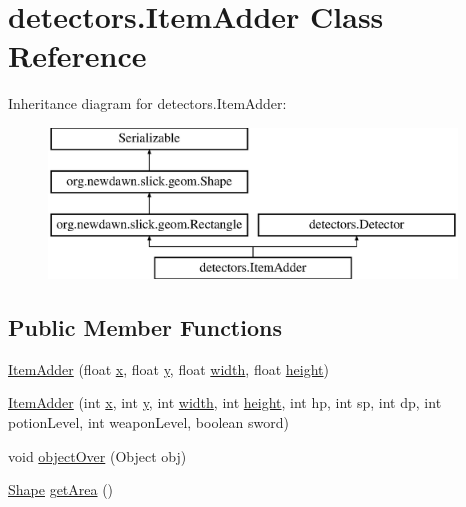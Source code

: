 \hypertarget{classdetectors_1_1_item_adder}{}\section{detectors.\+Item\+Adder Class Reference}
\label{classdetectors_1_1_item_adder}
Inheritance diagram for detectors.\+Item\+Adder\+:\begin{figure}[H]
\begin{center}
\leavevmode
\includegraphics[height=4.000000cm]{classdetectors_1_1_item_adder}
\end{center}
\end{figure}
\subsection*{Public Member Functions}
\begin{DoxyCompactItemize}
\item 
\mbox{\hyperlink{classdetectors_1_1_item_adder_af4b3e0a665b216da9f79393848081355}{Item\+Adder}} (float \mbox{\hyperlink{classorg_1_1newdawn_1_1slick_1_1geom_1_1_shape_a3e985bfff386c15a4efaad03d8ad60d3}{x}}, float \mbox{\hyperlink{classorg_1_1newdawn_1_1slick_1_1geom_1_1_shape_a9f934baded6a1b65ebb69e7e5f80ea00}{y}}, float \mbox{\hyperlink{classorg_1_1newdawn_1_1slick_1_1geom_1_1_rectangle_a967e1823f62daf45abb142779d1be62d}{width}}, float \mbox{\hyperlink{classorg_1_1newdawn_1_1slick_1_1geom_1_1_rectangle_a3bd010fdce636fc11ed0e0ad4d4b4a0a}{height}})
\item 
\mbox{\hyperlink{classdetectors_1_1_item_adder_a8a6ffb3f3af90b2c88fd613781be483d}{Item\+Adder}} (int \mbox{\hyperlink{classorg_1_1newdawn_1_1slick_1_1geom_1_1_shape_a3e985bfff386c15a4efaad03d8ad60d3}{x}}, int \mbox{\hyperlink{classorg_1_1newdawn_1_1slick_1_1geom_1_1_shape_a9f934baded6a1b65ebb69e7e5f80ea00}{y}}, int \mbox{\hyperlink{classorg_1_1newdawn_1_1slick_1_1geom_1_1_rectangle_a967e1823f62daf45abb142779d1be62d}{width}}, int \mbox{\hyperlink{classorg_1_1newdawn_1_1slick_1_1geom_1_1_rectangle_a3bd010fdce636fc11ed0e0ad4d4b4a0a}{height}}, int hp, int sp, int dp, int potion\+Level, int weapon\+Level, boolean sword)
\item 
void \mbox{\hyperlink{classdetectors_1_1_item_adder_a434a5f13dfd6987f9a55f9ccb7cf0d68}{object\+Over}} (Object obj)
\item 
\mbox{\hyperlink{classorg_1_1newdawn_1_1slick_1_1geom_1_1_shape}{Shape}} \mbox{\hyperlink{classdetectors_1_1_item_adder_ae42202ce2878233f85ab4a7b2d446140}{get\+Area}} ()
\end{DoxyCompactItemize}
